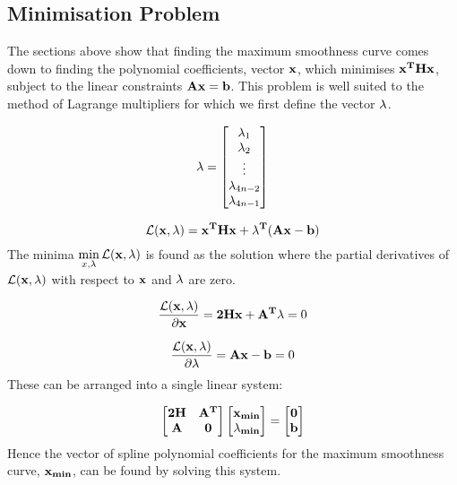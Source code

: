 \documentclass{article}
\begin{document}
\subsection{Minimisation Problem}
The sections above show that finding the maximum smoothness curve comes down to finding
the polynomial coefficients, vector $\mathbf{x}$, which minimises $\mathbf{x^THx}$, subject to the linear constraints
$\mathbf{Ax=b}$. This problem is well suited to the method of 
Lagrange multipliers for which we first define the vector $\mathbf{\lambda}$.

\begin{equation}
    \mathbf{\lambda} = \begin{bmatrix}
        \lambda_1 \\
        \lambda_2 \\
        \vdots \\
        \lambda_{4n-2} \\
        \lambda_{4n-1} \\
    \end{bmatrix}
\end{equation}

\newcommand{\Lagr}{\mathcal{L}}

\begin{equation}
    \Lagr(\+{x, \lambda}) = \+{x^THx + \lambda^T(Ax - b)}
\end{equation}
The minima $\displaystyle\min_{x, \lambda}\Lagr(\+{x, \lambda})$ is found as the solution
where the partial derivatives of $\Lagr(\+{x, \lambda})$ with respect to $\mathbf{x}$ and $\mathbf{\lambda}$
are zero.

\begin{equation}
    \frac{\Lagr(\+{x, \lambda})}{\partial{\+x}} = \+{2Hx + A^T\lambda} = 0
\end{equation}

\begin{equation}
    \frac{\Lagr(\+{x, \lambda})}{\partial{\+\lambda}} = \+{Ax - b} = 0
\end{equation}
These can be arranged into a single linear system:

\begin{equation}
    \begin{bmatrix}
        \mathbf{2H} & \mathbf{A^T} \\
        \mathbf{A} & \mathbf{0}
    \end{bmatrix}
    \begin{bmatrix}
        \mathbf{x_{min}} \\
        \mathbf{\lambda_{min}}
    \end{bmatrix} = 
    \begin{bmatrix}
        \mathbf{0} \\
        \mathbf{b}
    \end{bmatrix}
\end{equation}
Hence the vector of spline polynomial coefficients for the maximum smoothness curve, $\mathbf{x_{min}}$,
can be found by solving this system.
\end{document}
